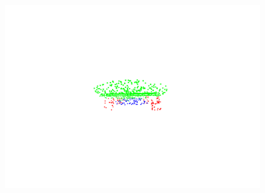 \begin{figure}[htbp]
\begin{minipage}{0.25\textwidth}
        \centering
        \includegraphics[width=\textwidth]{fig/supplement/part_segmentation/skateboard/skateboard02.pdf}
    \end{minipage}
    \hfill

    \vspace{0.5em}


\end{figure}
